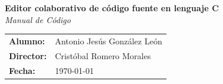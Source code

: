 \begin{titlepage}
\begin{center}
		\textbf{\Large Editor colaborativo de código fuente en lenguaje C}
		\\
		\vspace{1cm}
		\emph{\Large Manual de Código}
		\vspace{5cm}
		
	\end{center}

	\begin{flushright}
		\begin{tabular}{ll}
			\large{\textbf{Alumno:}}	&
			\large{Antonio Jesús González León} \\

			\large{\textbf{Director:}}	&
			\large{Cristóbal Romero Morales} \\

			\large{\textbf{Fecha:}}	&
			\large{\today} \\
		\end{tabular}
	\end{flushright}
	
	\clearpage

\end{titlepage}

\newpage{\pagestyle{empty}\cleardoublepage}
